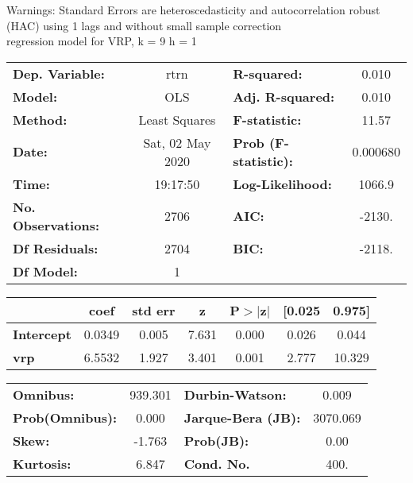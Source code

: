 Warnings: \newline
 [1] Standard Errors are heteroscedasticity and autocorrelation robust (HAC) using 1 lags and without small sample correction\\ 

regression model for VRP, k = 9 h = 1\begin{center}
\begin{tabular}{lclc}
\toprule
\textbf{Dep. Variable:}    &       rtrn       & \textbf{  R-squared:         } &     0.010   \\
\textbf{Model:}            &       OLS        & \textbf{  Adj. R-squared:    } &     0.010   \\
\textbf{Method:}           &  Least Squares   & \textbf{  F-statistic:       } &     11.57   \\
\textbf{Date:}             & Sat, 02 May 2020 & \textbf{  Prob (F-statistic):} &  0.000680   \\
\textbf{Time:}             &     19:17:50     & \textbf{  Log-Likelihood:    } &    1066.9   \\
\textbf{No. Observations:} &        2706      & \textbf{  AIC:               } &    -2130.   \\
\textbf{Df Residuals:}     &        2704      & \textbf{  BIC:               } &    -2118.   \\
\textbf{Df Model:}         &           1      & \textbf{                     } &             \\
\bottomrule
\end{tabular}
\begin{tabular}{lcccccc}
                   & \textbf{coef} & \textbf{std err} & \textbf{z} & \textbf{P$> |$z$|$} & \textbf{[0.025} & \textbf{0.975]}  \\
\midrule
\textbf{Intercept} &       0.0349  &        0.005     &     7.631  &         0.000        &        0.026    &        0.044     \\
\textbf{vrp}       &       6.5532  &        1.927     &     3.401  &         0.001        &        2.777    &       10.329     \\
\bottomrule
\end{tabular}
\begin{tabular}{lclc}
\textbf{Omnibus:}       & 939.301 & \textbf{  Durbin-Watson:     } &    0.009  \\
\textbf{Prob(Omnibus):} &   0.000 & \textbf{  Jarque-Bera (JB):  } & 3070.069  \\
\textbf{Skew:}          &  -1.763 & \textbf{  Prob(JB):          } &     0.00  \\
\textbf{Kurtosis:}      &   6.847 & \textbf{  Cond. No.          } &     400.  \\
\bottomrule
\end{tabular}
\end{center}

